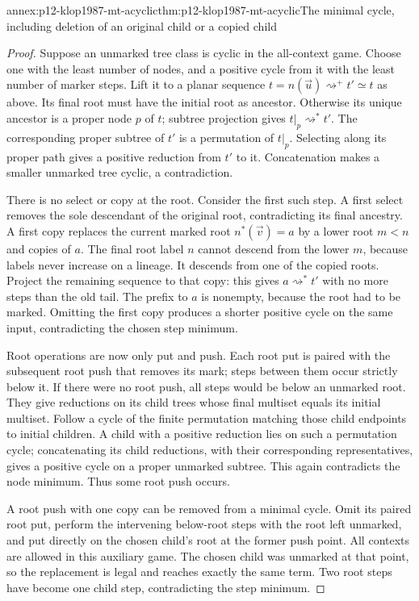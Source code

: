 \begin{annexitem}{annex:p12-klop1987-mt-acyclic}{thm:p12-klop1987-mt-acyclic}{The minimal cycle, including deletion of an original child or a copied child}
\begin{proof}
Suppose an unmarked tree class is cyclic in the all-context game.
Choose one with the least number of nodes, and a positive cycle
from it with the least number of marker steps. Lift it to a planar
sequence \(t=n(\vec u)\rightsquigarrow^+t'\simeq t\) as above.
Its final root must have the initial root as ancestor. Otherwise its
unique ancestor is a proper node \(p\) of \(t\); subtree projection
gives \(t|_p\rightsquigarrow^*t'\). The corresponding proper
subtree of \(t'\) is a permutation of \(t|_p\). Selecting along
its proper path gives a positive reduction from \(t'\) to it.
Concatenation makes a smaller unmarked tree cyclic, a contradiction.

There is no select or copy at the root. Consider the first such step.
A first select removes the sole descendant of the original root,
contradicting its final ancestry. A first copy replaces the current
marked root \(n^*(\vec v)=a\) by a lower root \(m<n\) and
copies of \(a\). The final root label \(n\) cannot descend
from the lower \(m\), because labels never increase on a lineage.
It descends from one of the copied roots. Project the remaining
sequence to that copy: this gives \(a\rightsquigarrow^*t'\)
with no more steps than the old tail. The prefix to \(a\) is
nonempty, because the root had to be marked. Omitting the first
copy produces a shorter positive cycle on the same input, contradicting
the chosen step minimum.

Root operations are now only put and push. Each root put is paired
with the subsequent root push that removes its mark; steps between
them occur strictly below it. If there were no root push, all steps
would be below an unmarked root. They give reductions on its child
trees whose final multiset equals its initial multiset. Follow a cycle
of the finite permutation matching those child endpoints to initial
children. A child with a positive reduction lies on such a permutation
cycle; concatenating its child reductions, with their corresponding
representatives, gives a positive cycle on a proper unmarked subtree.
This again contradicts the node minimum. Thus some root push occurs.

A root push with one copy can be removed from a minimal cycle.
Omit its paired root put, perform the intervening below-root steps
with the root left unmarked, and put directly on the chosen child's
root at the former push point. All contexts are allowed in this
auxiliary game. The chosen child was unmarked at that point, so the
replacement is legal and reaches exactly the same term. Two root
steps have become one child step, contradicting the step minimum.


\end{proof}
\end{annexitem}
